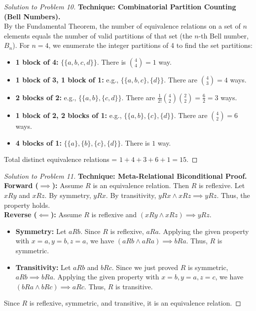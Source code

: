 \documentclass[11pt, a4paper]{article}
\theoremstyle{definition}
\theoremstyle{remark}
\begin{document}
\begin{proof}[Solution to Problem 10]
    \textbf{Technique: Combinatorial Partition Counting (Bell Numbers).} \\
    By the Fundamental Theorem, the number of equivalence relations on a set of $n$ elements equals the number of valid partitions of that set (the $n$-th Bell number, $B_n$). For $n=4$, we enumerate the integer partitions of 4 to find the set partitions:
    \begin{itemize}
        \item \textbf{1 block of 4:} $\{\{a,b,c,d\}\}$. There is $\binom{4}{4} = 1$ way.
        \item \textbf{1 block of 3, 1 block of 1:} e.g., $\{\{a,b,c\}, \{d\}\}$. There are $\binom{4}{3} = 4$ ways.
        \item \textbf{2 blocks of 2:} e.g., $\{\{a,b\}, \{c,d\}\}$. There are $\frac{1}{2!} \binom{4}{2}\binom{2}{2} = \frac{6}{2} = 3$ ways.
        \item \textbf{1 block of 2, 2 blocks of 1:} e.g., $\{\{a,b\}, \{c\}, \{d\}\}$. There are $\binom{4}{2} = 6$ ways.
        \item \textbf{4 blocks of 1:} $\{\{a\}, \{b\}, \{c\}, \{d\}\}$. There is $1$ way.
    \end{itemize}
    Total distinct equivalence relations = $1 + 4 + 3 + 6 + 1 = 15$.
\end{proof}

\begin{proof}[Solution to Problem 11]
    \textbf{Technique: Meta-Relational Biconditional Proof.} \\
    \textbf{Forward ($\implies$):} Assume $R$ is an equivalence relation. Then $R$ is reflexive. Let $xRy$ and $xRz$. By symmetry, $yRx$. By transitivity, $yRx \land xRz \implies yRz$. Thus, the property holds. \\
    \textbf{Reverse ($\impliedby$):} Assume $R$ is reflexive and $(xRy \land xRz) \implies yRz$.
    \begin{itemize}
        \item \textbf{Symmetry:} Let $aRb$. Since $R$ is reflexive, $aRa$. Applying the given property with $x=a, y=b, z=a$, we have $(aRb \land aRa) \implies bRa$. Thus, $R$ is symmetric.
        \item \textbf{Transitivity:} Let $aRb$ and $bRc$. Since we just proved $R$ is symmetric, $aRb \implies bRa$. Applying the given property with $x=b, y=a, z=c$, we have $(bRa \land bRc) \implies aRc$. Thus, $R$ is transitive.
    \end{itemize}
    Since $R$ is reflexive, symmetric, and transitive, it is an equivalence relation.
\end{proof}
\end{document}
